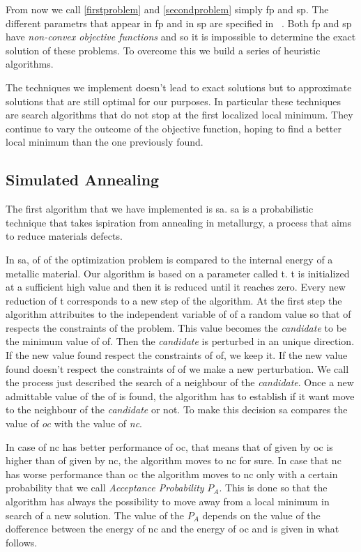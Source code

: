 \documentclass[journal]{IEEEtran}
\begin{document}
From now we call \ref{firstproblem} and \ref{secondproblem} simply \gls{fp} and \gls{sp}. The different parametrs that appear in \gls{fp} and in \gls{sp} are specified in ~\cite{Lin2007}. Both \gls{fp} and \gls{sp} have \textit{non-convex objective functions} and so it is impossible to determine the exact solution of these problems. To overcome this we build a series of heuristic algorithms.

The techniques we implement doesn't lead to exact solutions but to approximate solutions that are still optimal for our purposes. In particular these techniques are search algorithms that do not stop at the first localized local minimum. They continue to vary the outcome of the objective function, hoping to find a better local minimum than the one previously found.

\pagebreak

\subsection{Simulated Annealing}
The first algorithm that we have implemented is \gls{sa}. \gls{sa} is a probabilistic technique that takes ispiration from annealing in metallurgy, a process that aims to reduce materials defects.

In \gls{sa}, \gls{of} of the optimization problem is compared to the internal energy of a metallic material. Our algorithm is based on a parameter called \gls{t}. \gls{t} is initialized at a sufficient high value and then it is reduced until it reaches zero. Every new reduction of \gls{t} corresponds to a new step of the algorithm. At the first step the algorithm attribuites to the independent variable of \gls{of} a random value so that \gls{of} respects the constraints of the problem. This value becomes the \textit{candidate} to be the minimum value of \gls{of}. Then the \textit{candidate} is perturbed in an unique direction. If the new value found respect the constraints of \gls{of}, we keep it. If the new value found doesn't respect the constraints of \gls{of} we make a new perturbation. We call the process just described the search of a neighbour of the \textit{candidate}. Once a new admittable value of the \gls{of} is found, the algorithm has to establish if it want move to the neighbour of the \textit{candidate} or not. To make this decision \gls{sa} compares the value of \textit{oc} with the value of \textit{nc}.

 In case of \gls{nc} has better performance of \gls{oc}, that means that \gls{of} given by \gls{oc} is higher than \gls{of} given by \gls{nc}, the algorithm moves to \gls{nc} for sure. In case that \gls{nc} has worse performance than \gls{oc} the algorithm moves to \gls{nc} only with a certain probability that we call \textit{Acceptance Probability} $P_A$. This is done so that the algorithm has always the possibility to move away from a local minimum in search of a new solution. The value of the $P_A$ depends on the value of the dofference between the energy of \gls{nc} and the energy of \gls{oc} and is given in what follows.
\end{document}
